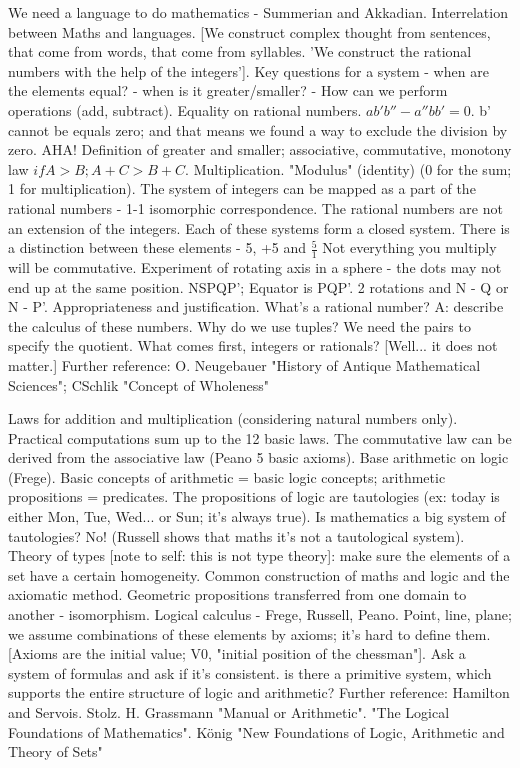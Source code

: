 \documentclass{cornell}
\begin{document}
%
{We need a language to do mathematics - Summerian and Akkadian. Interrelation between Maths and languages. [We construct complex thought from sentences, that come from words, that come from syllables. 'We construct the rational numbers with the help of the integers']. Key questions for a system - when are the elements equal? - when is it greater/smaller? - How can we perform operations (add, subtract). Equality on rational numbers. \( ab'b''-a''bb' = 0 \). b' cannot be equals zero; and that means we found a way to exclude the division by zero. AHA! Definition of greater and smaller; associative, commutative, monotony law \( if A > B; A+C>B+C \). Multiplication. "Modulus" (identity) (0 for the sum; 1 for multiplication). The system of integers can be mapped as a part of the rational numbers - 1-1 isomorphic correspondence. The rational numbers are not an extension of the integers. Each of these systems form a closed system. There is a distinction between these elements - 5, +5 and \( \frac{5}{1} \) }%
{Not everything you multiply will be commutative. Experiment of rotating axis in a sphere - the dots may not end up at the same position. NSPQP'; Equator is PQP'. 2 rotations and N - Q or N - P'. Appropriateness and justification. What's a rational number? A: describe the calculus of these numbers. Why do we use tuples? We need the pairs to specify the quotient. What comes first, integers or rationals? [Well... it does not matter.] }%
{Further reference: O. Neugebauer "History of Antique Mathematical Sciences"; CSchlik "Concept of Wholeness"}%

%
{ Laws for addition and multiplication (considering natural numbers only). Practical computations sum up to the 12 basic laws. The commutative law can be derived from the associative law (Peano 5 basic axioms). Base arithmetic on logic (Frege). Basic concepts of arithmetic = basic logic concepts; arithmetic propositions = predicates. The propositions of logic are tautologies (ex: today is either Mon, Tue, Wed... or Sun; it's always true). Is mathematics a big system of tautologies? No! (Russell shows that maths it's not a tautological system). Theory of types [note to self: this is not type theory]: make sure the elements of a set have a certain homogeneity. Common construction of maths and logic and the axiomatic method. Geometric propositions transferred from one domain to another - isomorphism. Logical calculus - Frege, Russell, Peano. Point, line, plane; we assume combinations of these elements by axioms; it's hard to define them. [Axioms are the initial value; V0, "initial position of the chessman"]. Ask a system of formulas and ask if it's consistent. is there a primitive system, which supports the entire structure of logic and arithmetic? }%
{Further reference: Hamilton and Servois. Stolz. H. Grassmann "Manual or Arithmetic". "The Logical Foundations of Mathematics". König "New Foundations of Logic, Arithmetic and Theory of Sets"}%
\end{document}
